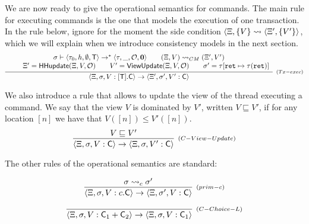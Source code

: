 \documentclass[a4paper,UKenglish]{article}%
\theoremstyle{plain}
\begin{document}
We are now ready to give the operational semantics for commands.
The main rule for executing commands is the one that models the execution of one transaction. 
In the rule below, ignore for the moment the side condition $\langle \Xi, \{V\} \leadsto \langle \Xi', \{V'\} \rangle$, 
which we will explain when we introduce consistency models in the next section.
\[
\infer[{\scriptstyle(Tx-exec)}]{\langle \hh, \thdstack, V: [\trans].\cmd \rangle \rightarrow \langle \hh', \thdstack', V': \cmd \rangle}
{\begin{array}{c}
\thdstack \vdash \langle \txstack_{0}, \heap, \emptyset, \trans \rangle \rightarrow^{\ast} \langle \txstack, \_, \mathcal{O}, \nil \rangle \qquad
(\hh, V) \leadsto_{CM} (\hh', V') \\
\qquad
\hh' = \mathsf{HHupdate}(\hh, V, \mathcal{O}) \qquad V' = \mathsf{ViewUpdate}(\hh, V, \mathcal{O}) \qquad 
\thdstack' = \txstack[\retvar \mapsto \txstack(\retvar)]
\end{array}
}
\]

We also introduce a rule that allows to update the view of the thread executing a command. 
We say that the view $V$ is dominated by $V'$, written $V \sqsubseteq V'$, if for any 
location $[n]$ we have that $V([n]) \leq V'([n])$.
\[
\infer[{\scriptstyle{(C-View-Update)}}]
{\langle \hh, \thdstack, V: \cmd \rangle \rightarrow \langle \hh, \thdstack, V' : \cmd \rangle }
{ V \sqsubseteq V'}
\]

The other rules of the operational semantics are standard: 

\[
\infer[{\scriptstyle{(prim-c)}}]
{\langle \hh, \thdstack, V: \primc.\cmd \rangle \rightarrow \langle \hh, \thdstack', V: \cmd \rangle}
{\thdstack \rightsquigarrow_c \thdstack'} 
\]

\[
\infer[{\scriptstyle{(C-Choice-L)}}]
{\langle \hh, \thdstack, V: \cmd_1 + \cmd_2 \rangle \rightarrow \langle \hh, \thdstack, V: \cmd_1 \rangle}
{} 
\]
\end{document}
